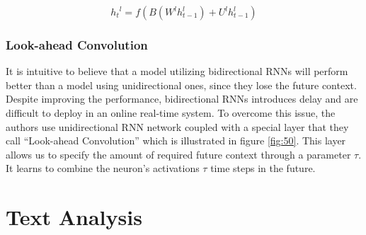 \begin{equation}
\label{eq:30}
	{h_t}^l = f(B(W^l h^l_{t-1}) + U^l h^l_{t-1}) 
\end{equation}


\subsubsection{Look-ahead Convolution}
\label{bg:s3_sub3_subsub3}

It is intuitive to believe that a model utilizing bidirectional \ac{RNN}s will perform better than a model using unidirectional ones, since they lose the future context. Despite improving the performance, bidirectional \ac{RNN}s introduces delay and are difficult to deploy in an online real-time system.
To overcome this issue, the authors use unidirectional \ac{RNN} network coupled with a special layer that they call \enquote{Look-ahead Convolution} which is illustrated in figure \ref{fig:50}. This layer allows us to specify the amount of required future context through a parameter $\tau$. It learns to combine the neuron's activations $\tau$ time steps in the future.




















\section{Text Analysis} 
\label{bg:s4}


